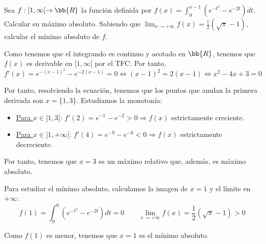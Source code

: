 \begin{ejercicio}
    Sea $f:[1,\infty[ \to\bb{R}$ la función definida por $f(x)=\int_0^{x-1}(e^{-t^2}-e^{-2t})dt$. Calcular su máximo absoluto. Sabiendo que $\displaystyle \lim_{x\to+\infty}f(x) = \frac{1}{2}(\sqrt{\pi}-1)$, calcular el mínimo absoluto de $f$.

    Como tenemos que el integrando es continuo y acotado en $\bb{R}$, tenemos que $f(x)$ es derivable en $[1,\infty[$ por el TFC. Por tanto,
    \begin{equation*}
        f'(x) = e^{-(x-1)^2} -e^{-2(x-1)} = 0 \Longleftrightarrow (x-1)^2 = 2(x-1) \Longleftrightarrow x^2-4x+3=0
    \end{equation*}

    Por tanto, resolviendo la ecuación, tenemos que los puntos que anulan la primera derivada son $x=\{1,3\}$. Estudiamos la monotonía:
    \begin{itemize}
        \item \underline{Para $x\in ]1, 3[$}: $f'(2)=e^{-1}-e^{-2}>0\Longrightarrow f(x)$ estrictamente creciente.
        \item \underline{Para $x\in ]1,+\infty[$}: $f'(4)=e^{-9}-e^{-6}<0\Longrightarrow f(x)$ estrictamente decreciente.
    \end{itemize}


    Por tanto, tenemos que $x=3$ es un máximo relativo que, además, es máximo absoluto.

    Para estudiar el mínimo absoluto, calculamos la imagen de $x=1$ y el límite en $+\infty$:
    \begin{equation*}
        f(1)=\int_0^{0}(e^{-t^2}-e^{-2t})dt=0 \qquad \lim_{x\to+\infty}f(x) = \frac{1}{2}(\sqrt{\pi}-1)>0
    \end{equation*}

    Como $f(1)$ es menor, tenemos que $x=1$ es el mínimo absoluto.
    
\end{ejercicio}

